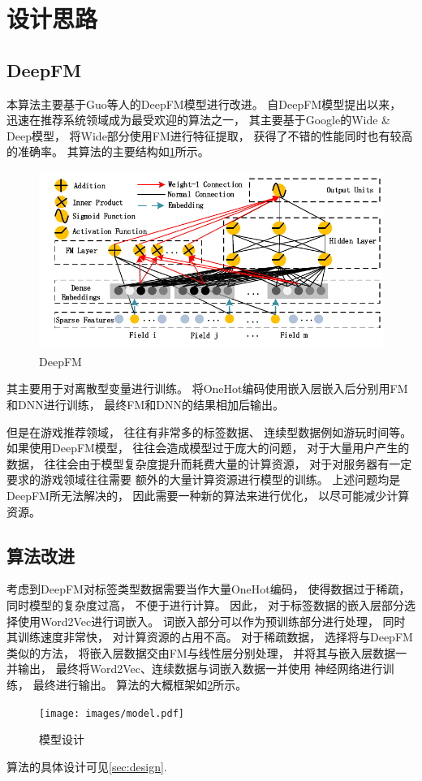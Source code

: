 \section{设计思路}

\subsection{DeepFM}

本算法主要基于Guo等人的DeepFM模型\cite{guoDeepFMFactorizationMachineBased2017}进行改进。
自DeepFM模型提出以来，
迅速在推荐系统领域成为最受欢迎的算法之一，
其主要基于Google的Wide \& Deep模型，
将Wide部分使用FM进行特征提取，
获得了不错的性能同时也有较高的准确率。
其算法的主要结构如\cref{fig:deepfm}所示。

\begin{figure}[!htbp]
	\centering
	\includegraphics[width=.9\textwidth]{images/architecture-deepfm.pdf}
	\caption{DeepFM}\label{fig:deepfm}
\end{figure}

其主要用于对离散型变量进行训练。
将OneHot编码使用嵌入层嵌入后分别用FM和DNN进行训练，
最终FM和DNN的结果相加后输出。

但是在游戏推荐领域，
往往有非常多的标签数据、
连续型数据例如游玩时间等。
如果使用DeepFM模型，
往往会造成模型过于庞大的问题，
对于大量用户产生的数据，
往往会由于模型复杂度提升而耗费大量的计算资源，
对于对服务器有一定要求的游戏领域往往需要
额外的大量计算资源进行模型的训练。
上述问题均是DeepFM所无法解决的，
因此需要一种新的算法来进行优化，
以尽可能减少计算资源。

\subsection{算法改进}

考虑到DeepFM对标签类型数据需要当作大量OneHot编码，
使得数据过于稀疏，
同时模型的复杂度过高，
不便于进行计算。
因此，
对于标签数据的嵌入层部分选择使用Word2Vec进行词嵌入。
词嵌入部分可以作为预训练部分进行处理，
同时其训练速度非常快，
对计算资源的占用不高。
对于稀疏数据，
选择将与DeepFM类似的方法，
将嵌入层数据交由FM与线性层分别处理，
并将其与嵌入层数据一并输出，
最终将Word2Vec、连续数据与词嵌入数据一并使用
神经网络进行训练，
最终进行输出。
算法的大概框架如\cref{fig:model}所示。

\begin{figure}[!htbp]
	\centering
	\texttt{[image: images/model.pdf]}
	\caption{模型设计}\label{fig:model}
\end{figure}

算法的具体设计可见\cref{sec:design}.